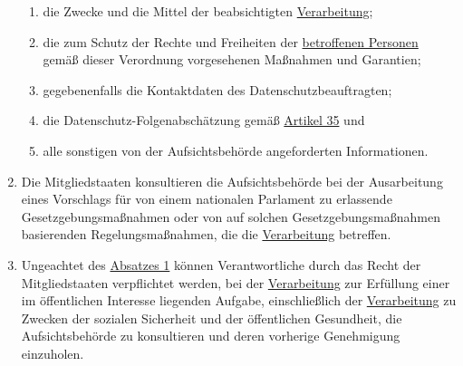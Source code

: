 \begin{enumerate}
\begin{enumerate}
    \item die Zwecke und die Mittel der beabsichtigten \hyperref[itm:04-2]{Verarbeitung};
    \label{itm:36-3b}

    \item die zum Schutz der Rechte und Freiheiten der \hyperref[itm:04-1]{betroffenen Personen} gemäß dieser Verordnung vorgesehenen
     Maßnahmen und Garantien;
    \label{itm:36-3c}

    \item gegebenenfalls die Kontaktdaten des Datenschutzbeauftragten;
    \label{itm:36-3d}

    \item die Datenschutz-Folgenabschätzung gemäß \hyperref[ch:35]{Artikel 35} und
    \label{itm:36-3e}

    \item alle sonstigen von der Aufsichtsbehörde angeforderten Informationen.
    \label{itm:36-3f}

  \end{enumerate}

  \item Die Mitgliedstaaten konsultieren die Aufsichtsbehörde bei der Ausarbeitung eines Vorschlags für von einem
   nationalen Parlament zu erlassende Gesetzgebungsmaßnahmen oder von auf solchen Gesetzgebungsmaßnahmen basierenden
   Regelungsmaßnahmen, die die \hyperref[itm:04-2]{Verarbeitung} betreffen.
  \label{itm:36-4}

  \item Ungeachtet des \hyperref[itm:36-1]{Absatzes 1} können Verantwortliche durch das Recht der Mitgliedstaaten
   verpflichtet werden, bei der \hyperref[itm:04-2]{Verarbeitung} zur Erfüllung einer im öffentlichen Interesse liegenden Aufgabe,
   einschließlich der \hyperref[itm:04-2]{Verarbeitung} zu Zwecken der sozialen Sicherheit und der öffentlichen Gesundheit, die
   Aufsichtsbehörde zu konsultieren und deren vorherige Genehmigung einzuholen.
  \label{itm:36-5}
   
\end{enumerate}


